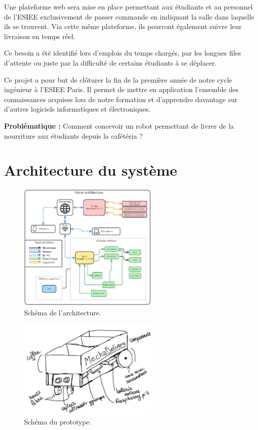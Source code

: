 \documentclass[a4paper,12pt]{report}  %
\begin{document}
Une plateforme web sera mise en place permettant aux étudiants et au
personnel de l'ESIEE exclusivement de passer commande en indiquant la
salle dans laquelle ils se trouvent. Via cette même plateforme, ils
pourront également suivre leur livraison en temps réel.

Ce besoin a été identifié lors d'emplois du temps
chargés, par les longues files d'attente ou juste par la
difficulté de certains étudiants à se déplacer.

Ce projet a pour but de clôturer la fin de la première année de notre
cycle ingénieur à l'ESIEE Paris. Il permet de mettre en
application l'ensemble des connaissances acquises lors
de notre formation et d'apprendre davantage sur
d'autres logiciels informatiques et électroniques.

\textbf{Problématique :} Comment concevoir un robot permettant
de livrer de la nourriture aux étudiants depuis la cafétéria ?

\section{Architecture du système}

\begin{figure}[H]
	\centering
	\includegraphics[width=0.6\textwidth]{./attachments/arch/2025-06-21-1200_Architecture.pdf}
	\caption{Schéma de l'architecture. }

\end{figure}

\begin{figure}[H]
	\centering
	\includegraphics[width=0.6\textwidth]{./attachments/sketch.jpg}
	\caption{Schéma du prototype. }
	\label{fig:schema_proto}
\end{figure}
\end{document}
